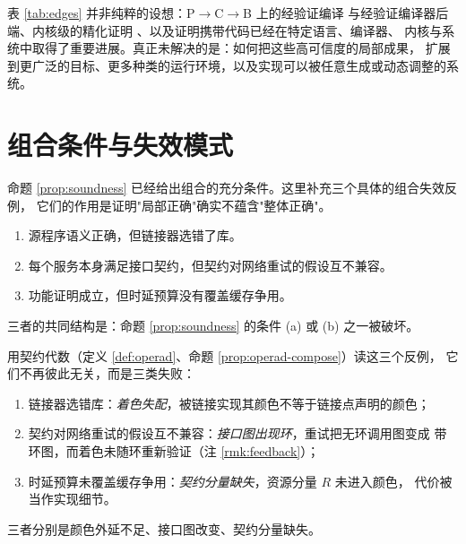 \begin{remark}[每条边上已有的工程实现]
表 \ref{tab:edges} 并非纯粹的设想：P$\to$C$\to$B 上的经验证编译
\cite{leroy2009}与经验证编译器后端\cite{cakeml2019}、内核级的精化证明
\cite{klein2009}、以及证明携带代码\cite{necula1997}已经在特定语言、编译器、
内核与系统中取得了重要进展。真正未解决的是：如何把这些高可信度的局部成果，
扩展到更广泛的目标、更多种类的运行环境，以及实现可以被任意生成或动态调整的系统。
\end{remark}

\section{组合条件与失效模式}\label{sec:composition}

命题 \ref{prop:soundness} 已经给出组合的充分条件。这里补充三个具体的组合失效反例，
它们的作用是证明"局部正确"确实不蕴含"整体正确"。

\begin{example}[三个组合失效]\label{ex:compose-fail}
\begin{enumerate}[label=(\alph*)]
\item 源程序语义正确，但链接器选错了库。
\item 每个服务本身满足接口契约，但契约对网络重试的假设互不兼容。
\item 功能证明成立，但时延预算没有覆盖缓存争用。
\end{enumerate}
三者的共同结构是：命题 \ref{prop:soundness} 的条件 (a) 或 (b) 之一被破坏。
\end{example}

用契约代数（定义 \ref{def:operad}、命题 \ref{prop:operad-compose}）读这三个反例，
它们不再彼此无关，而是三类失败：

\begin{corollary}[三个反例的共同结构]\label{cor:three-failures}
\begin{enumerate}[label=(\alph*)]
\item 链接器选错库：\emph{着色失配}，被链接实现其颜色不等于链接点声明的颜色；
\item 契约对网络重试的假设互不兼容：\emph{接口图出现环}，重试把无环调用图变成
      带环图，而着色未随环重新验证（注 \ref{rmk:feedback}）；
\item 时延预算未覆盖缓存争用：\emph{契约分量缺失}，资源分量 $R$ 未进入颜色，
      代价被当作实现细节。
\end{enumerate}
三者分别是颜色外延不足、接口图改变、契约分量缺失。
\end{corollary}

